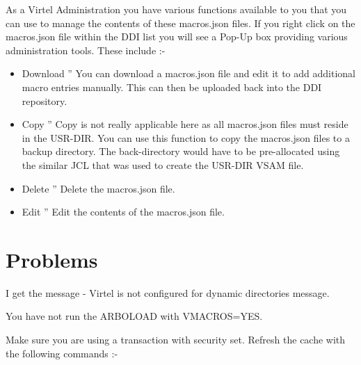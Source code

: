 \documentclass[letterpaper,10pt,english]{sphinxmanual}
\begin{document}
As a Virtel Administration you have various functions available to you that you can use to manage the contents of these macros.json files. If you right click on the macros.json file within the DDI list you will see a Pop-Up box providing various administration tools. These include :-

\begin{itemize}
\item {} 
Download ” You can download a macros.json file and edit it to add additional macro entries manually. This can then be uploaded back into the DDI repository.

\item {} 
Copy ” Copy is not really applicable here as all macros.json files must reside in the USR-DIR. You can use this function to copy the macros.json files to a backup directory. The back-directory would have to be pre-allocated using the similar JCL that was used to create the USR-DIR VSAM file.

\item {} 
Delete ” Delete the macros.json file.

\item {} 
Edit ” Edit the contents of the macros.json file.

\end{itemize}


\newpage


\section{Problems}
\label{\detokenize{TN202002:id1}}

I get the message - Virtel is not configured for dynamic directories message.



You have not run the ARBOLOAD with VMACROS=YES.


Make sure you are using a transaction with security set. Refresh the cache with the following commands :-

\begin{sphinxVerbatim}[commandchars=\\\{\}]
 
\end{sphinxVerbatim}
\end{document}
